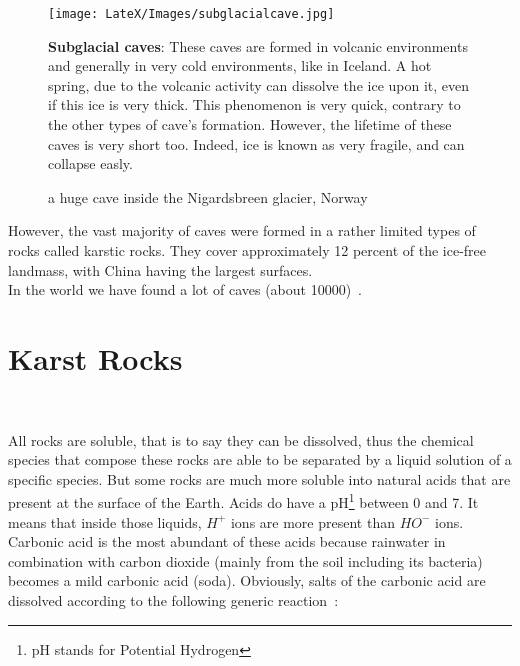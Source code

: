 \documentclass[draft, final]{report}
\begin{document}
\begin{itemize}
\begin{figure}[!ht]
  \begin{minipage}[c]{0.50\linewidth}
    \begin{center}
      \texttt{[image: LateX/Images/subglacialcave.jpg]}
      \caption{a huge cave inside the Nigardsbreen glacier, Norway\cite{subglacialcave}}
    \end{center}
  \end{minipage}\hfill
  \begin{minipage}[c]{0.50\linewidth}
      \item \textbf{Subglacial caves}: These caves are formed in volcanic environments and generally in very cold environments, like in Iceland. A hot spring, due to the volcanic activity can dissolve the ice upon it, even if this ice is very thick. This phenomenon is very quick, contrary to the other types of cave’s formation. However, the lifetime of these caves is very short too. Indeed, ice is known as very fragile, and can collapse easly.
  \end{minipage}
\end{figure}

\end{itemize}
\break
However, the vast majority of caves were formed in a rather limited types of rocks called karstic rocks. They cover approximately 12 percent of the ice-free landmass, with China having the largest surfaces.\\
In the world we have found a lot of caves (about 10000) .\\

\chapter{Karst Rocks}
~\par
All rocks are soluble, that is to say they can be dissolved, thus the chemical species that compose these rocks are able to be separated by a liquid solution of a specific species. But some rocks are much more soluble into natural acids that are present at the surface of the Earth. Acids do have a pH\footnote{pH stands for Potential Hydrogen} between 0 and 7. It means that inside those liquids, $H^{+}$ ions are more present than $HO^{-}$ ions. Carbonic acid is the most abundant of these acids because rainwater in combination with carbon dioxide (mainly from the soil including its bacteria) becomes a mild carbonic acid (soda). Obviously, salts of the carbonic acid are dissolved according to the following generic reaction :\\
\end{document}
